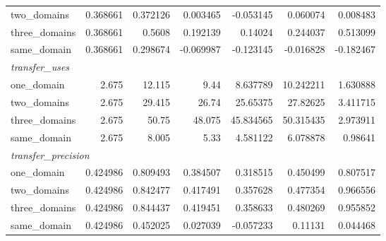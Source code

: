 \begin{tabular}{lrrrrrr}
  two_domains & 0.368661 & 0.372126 & 0.003465 & -0.053145 & 0.060074 & 0.008483 \\
  three_domains & 0.368661 & 0.5608 & 0.192139 & 0.14024 & 0.244037 & 0.513099 \\
  same_domain & 0.368661 & 0.298674 & -0.069987 & -0.123145 & -0.016828 & -0.182467 \\
  \multicolumn{7}{l}{\textit{transfer_uses}} \\
  one_domain & 2.675 & 12.115 & 9.44 & 8.637789 & 10.242211 & 1.630888 \\
  two_domains & 2.675 & 29.415 & 26.74 & 25.65375 & 27.82625 & 3.411715 \\
  three_domains & 2.675 & 50.75 & 48.075 & 45.834565 & 50.315435 & 2.973911 \\
  same_domain & 2.675 & 8.005 & 5.33 & 4.581122 & 6.078878 & 0.98641 \\
  \multicolumn{7}{l}{\textit{transfer_precision}} \\
  one_domain & 0.424986 & 0.809493 & 0.384507 & 0.318515 & 0.450499 & 0.807517 \\
  two_domains & 0.424986 & 0.842477 & 0.417491 & 0.357628 & 0.477354 & 0.966556 \\
  three_domains & 0.424986 & 0.844437 & 0.419451 & 0.358633 & 0.480269 & 0.955852 \\
  same_domain & 0.424986 & 0.452025 & 0.027039 & -0.057233 & 0.11131 & 0.044468 \\
\bottomrule
\end{tabular}